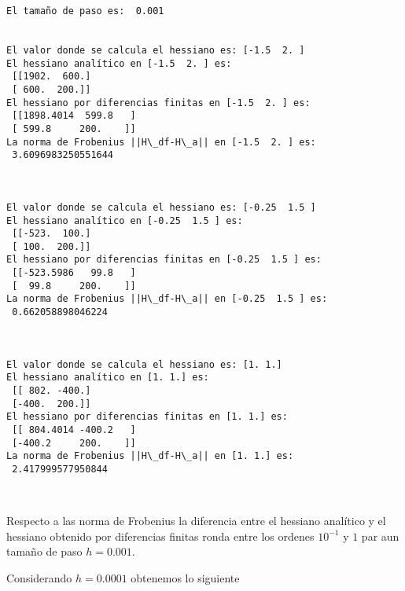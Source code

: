 \documentclass[11pt]{article}
\begin{document}
    \begin{Verbatim}[commandchars=\\\{\}]
El tamaño de paso es:  0.001


El valor donde se calcula el hessiano es: [-1.5  2. ]
El hessiano analítico en [-1.5  2. ] es:
 [[1902.  600.]
 [ 600.  200.]]
El hessiano por diferencias finitas en [-1.5  2. ] es:
 [[1898.4014  599.8   ]
 [ 599.8     200.    ]]
La norma de Frobenius ||H\_df-H\_a|| en [-1.5  2. ] es:
 3.6096983250551644



El valor donde se calcula el hessiano es: [-0.25  1.5 ]
El hessiano analítico en [-0.25  1.5 ] es:
 [[-523.  100.]
 [ 100.  200.]]
El hessiano por diferencias finitas en [-0.25  1.5 ] es:
 [[-523.5986   99.8   ]
 [  99.8     200.    ]]
La norma de Frobenius ||H\_df-H\_a|| en [-0.25  1.5 ] es:
 0.662058898046224



El valor donde se calcula el hessiano es: [1. 1.]
El hessiano analítico en [1. 1.] es:
 [[ 802. -400.]
 [-400.  200.]]
El hessiano por diferencias finitas en [1. 1.] es:
 [[ 804.4014 -400.2   ]
 [-400.2     200.    ]]
La norma de Frobenius ||H\_df-H\_a|| en [1. 1.] es:
 2.417999577950844



    \end{Verbatim}

    Respecto a las norma de Frobenius la diferencia entre el hessiano
analítico y el hessiano obtenido por diferencias finitas ronda entre los
ordenes \(10^{-1}\) y \(1\) par aun tamaño de paso \(h=0.001\).

Considerando \(h=0.0001\) obtenemos lo siguiente
\end{document}
